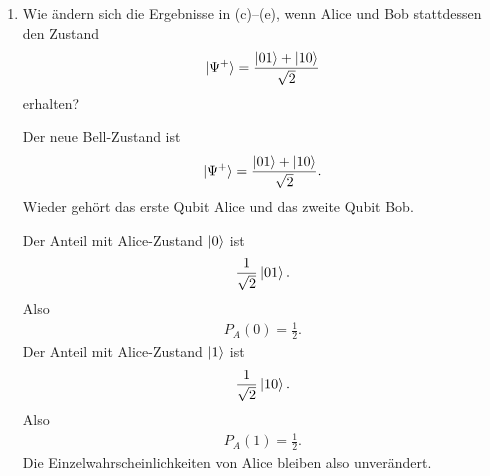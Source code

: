 \documentclass[11pt,a4paper]{scrartcl}
\begin{document}
\begin{enumerate}[label=(\alph*)]
\begin{calculationbox}
            \begin{solutionbox}[title=Perfekte Korrelation]
                Alice und Bob sind perfekt korreliert, weil der Bell-Zustand $\ket{\Phi^+}$ nur gleiche Bitwerte enthält:
                \begin{align*}
                    \ket{\Phi^+}
                    =
                    \frac{\ket{00}+\ket{11}}{\sqrt2}.
                \end{align*}
                Bei Messung in der Rechenbasis gilt daher immer
                \begin{align*}
                    A=B.
                \end{align*}
            \end{solutionbox}
        \end{calculationbox}

        \item Wie ändern sich die Ergebnisse in (c)--(e), wenn Alice und Bob stattdessen den Zustand
        \begin{align*}
            \ket{\Psi^+}
            =
            \frac{\ket{01}+\ket{10}}{\sqrt2}
        \end{align*}
        erhalten?

        \begin{calculationbox}
            Der neue Bell-Zustand ist
            \begin{align*}
                \ket{\Psi^+}
                =
                \frac{\ket{01}+\ket{10}}{\sqrt2}.
            \end{align*}
            Wieder gehört das erste Qubit Alice und das zweite Qubit Bob.

            \begin{calculationbox}[title=Messwahrscheinlichkeiten von Alice]
                Der Anteil mit Alice-Zustand $\ket{0}$ ist
                \begin{align*}
                    \frac1{\sqrt2}\ket{01}.
                \end{align*}
                Also
                \begin{align*}
                    P_A(0)
                    =
                    \frac12.
                \end{align*}
                Der Anteil mit Alice-Zustand $\ket{1}$ ist
                \begin{align*}
                    \frac1{\sqrt2}\ket{10}.
                \end{align*}
                Also
                \begin{align*}
                    P_A(1)
                    =
                    \frac12.
                \end{align*}
                Die Einzelwahrscheinlichkeiten von Alice bleiben also unverändert.
            \end{calculationbox}


\end{calculationbox}
\end{enumerate}
\end{document}
